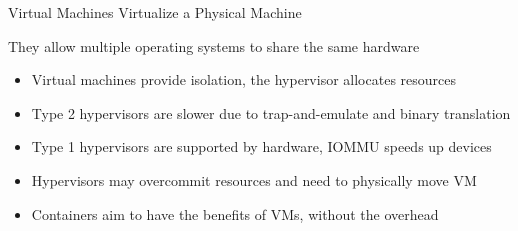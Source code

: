   \begin{frame}{Virtual Machines Virtualize a Physical Machine}

    They allow multiple operating systems to share the same hardware
    \begin{itemize}
      \item Virtual machines provide isolation, the hypervisor allocates
            resources
      \item Type 2 hypervisors are slower due to trap-and-emulate and binary
            translation
      \item Type 1 hypervisors are supported by hardware, IOMMU speeds up devices
      \item Hypervisors may overcommit resources and need to physically move VM
      \item Containers aim to have the benefits of VMs, without the overhead
    \end{itemize}
  \end{frame}

